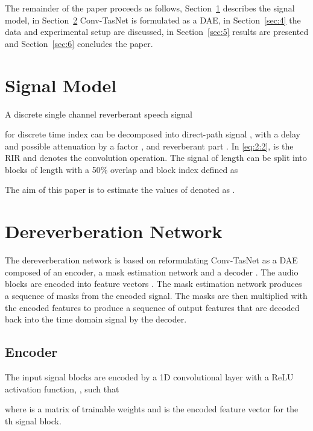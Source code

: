 \documentclass[conference,a4paper]{IEEEtran}
\begin{document}
The remainder of the paper proceeds as follows, Section~\ref{sec:2} describes the signal model, in Section~\ref{sec:3} \ac{Conv-TasNet} is formulated as a \ac{DAE}, in Section~\ref{sec:4} the data and experimental setup are discussed, in Section~\ref{sec:5} 
results are presented and 
Section~\ref{sec:6} {concludes the paper.}


\section{Signal Model}\label{sec:2}
A discrete single channel reverberant speech signal

for discrete time index  can be decomposed into direct-path signal  , with a delay  and possible attenuation by a factor , and reverberant part . In \eqref{eq:2:2},  is the \ac{RIR} and  denotes the convolution operation. The signal of length  can be split into   blocks of length  with a 50\% overlap and block index  defined as

The aim of this paper is {to} estimate the values of  denoted as .

\section{Dereverberation Network}\label{sec:3}
The dereverberation network is based on reformulating \ac{Conv-TasNet} as a \ac{DAE} composed of an encoder, {a} mask estimation network and a decoder \cite{convtasnet,RGH22_AttTASNET}. The audio blocks  are encoded into feature vectors . The mask estimation network
produces a sequence of masks from the encoded signal. The masks  are then multiplied with the encoded features  to produce a sequence of output features that are decoded back into the time domain signal by the decoder.
\subsection{Encoder}
The input signal blocks  are encoded by a 1D convolutional layer with a \ac{ReLU} activation function, , such that

where  is a matrix of trainable weights and  is the encoded feature vector for the th signal block. 
\end{document}
